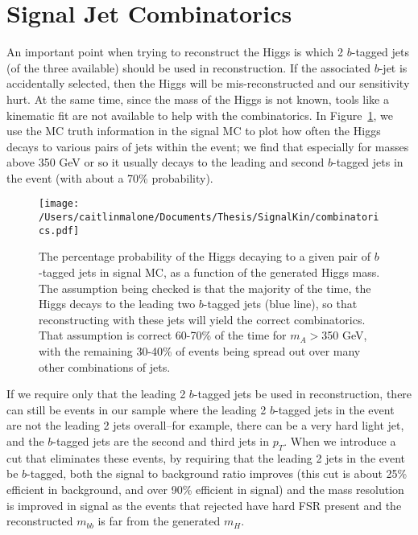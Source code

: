 \section{Signal Jet Combinatorics}
\label{sec:combinatorics}
An important point when trying to reconstruct the Higgs is which 2 $b$-tagged jets (of the
three available) should be used in reconstruction.  If the associated $b$-jet is accidentally
selected, then the Higgs will be mis-reconstructed and our sensitivity hurt.  At the same time,
since the mass of the Higgs is not known, tools like a kinematic fit are not available to
help with the combinatorics.  In Figure~\ref{fig:combinatorics}, we use the MC truth
information in the signal MC to plot how often the Higgs decays to various pairs of jets
within the event; we find that especially for masses above 350 GeV or so it usually decays to
the leading and second $b$-tagged jets in the event (with about a 70\% probability).
    
\begin{figure}[hbt]
  \texttt{[image: /Users/caitlinmalone/Documents/Thesis/SignalKin/combinatorics.pdf]}
  \label{fig:combinatorics}
  \caption{The percentage probability of the Higgs decaying to a given pair of $b$-tagged jets in signal MC,
    as a function of the generated Higgs mass.  The assumption being checked is that the majority of
    the time, the Higgs decays to the leading two $b$-tagged jets (blue line), so that reconstructing with these jets
    will yield the correct combinatorics.  That assumption is correct 60-70\% of the time for $m_A>$350 GeV,
    with the remaining 30-40\% of events being spread out over many other combinations of jets.}
\end{figure}
                                                                                                                                    
                                                                                                                                    
If we require only that the leading 2 $b$-tagged jets be used in reconstruction, there can                                          
still be events in our sample where the leading 2 $b$-tagged jets in the event are not                                              
the leading 2 jets overall--for example, there can be a very hard light jet, and the $b$-tagged                                     
jets are the second and third jets in $p_T$.  When we introduce a cut that eliminates these events,                                 
by requiring that the leading 2 jets in the event be $b$-tagged, both the signal to background                                      
ratio improves (this cut is about 25\% efficient in background, and over 90\% efficient                                             
in signal) and the mass resolution is improved in signal as the events that rejected have                                           
hard FSR present and the reconstructed $m_{bb}$ is far from the generated $m_H$.    




